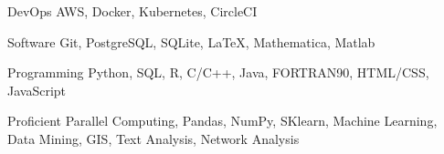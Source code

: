 

\begin{cvskills}

  \cvskill
    {DevOps} %
    {AWS, Docker, Kubernetes, CircleCI} %


  \cvskill
    {Software} %
    {Git, PostgreSQL, SQLite, \LaTeX, Mathematica, Matlab} %

  \cvskill
    {Programming} %
    {Python, SQL, R, C/C++, Java, FORTRAN90, HTML/CSS, JavaScript} %

  \cvskill
    {Proficient} %
    {Parallel Computing, Pandas, NumPy, SKlearn, Machine Learning, Data Mining, GIS, Text Analysis, Network Analysis} %

\end{cvskills}
